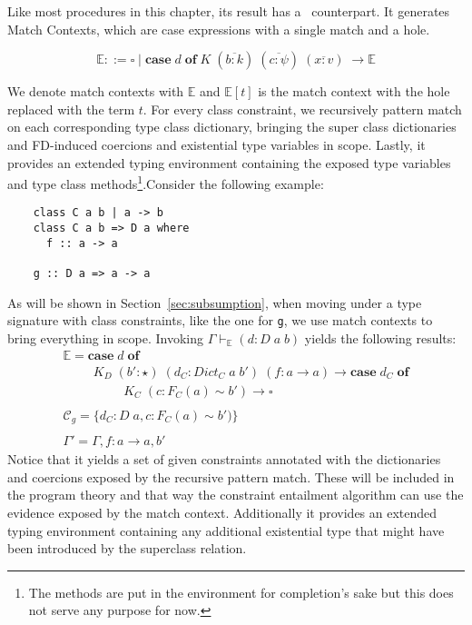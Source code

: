 Like most procedures in this chapter, its result has a \systemfc
~counterpart. It generates Match Contexts, which are case expressions with a
single match and a hole.
\begin{figure}[h]
$$
\mathbb{E} ::= \square \mid \textbf{case} \; d \; \textbf{of} \; K \;
(\overline{b : k}) \; (\overline{c : \psi}) \; (\overline{x : v}) \; \rightarrow
\mathbb{E}
$$
\end{figure}
We denote match contexts with $\mathbb{E}$ and $\mathbb{E}[t]$ is the match
context with the hole replaced with the term $t$.
For every class constraint, we recursively pattern match on each corresponding
type class dictionary, bringing the super class dictionaries and FD-induced
coercions and existential type variables in scope.
Lastly, it provides an extended typing environment containing the exposed type
variables and type class methods\footnote{The methods are put in the environment
for completion's sake but this does not serve any purpose for now.}.Consider the
following example:
\begin{verbatim}
    class C a b | a -> b
    class C a b => D a where
      f :: a -> a

    g :: D a => a -> a
\end{verbatim}
As will be shown in Section~\ref{sec:subsumption}, when moving under a type
signature with class constraints, like the one for \texttt{g}, we use match
contexts to bring everything in scope. Invoking $\Gamma \vdash_{\mathbb{E}} (d :
D \; a \; b)$ yields the following results:
\[
\begin{array}{l}
  \mathbb{E} = \textbf{case} \; d \; \textbf{of} \\ \hspace{1cm} K_D \; (b' :
  \star) \; (d_C : Dict_C \; a \; b') \; (f : a \rightarrow a) \rightarrow
  \textbf{case} \; d_C \; \textbf{of}
  \\
  \hspace{2cm} K_C \; (c : F_C(a) \sim b') \rightarrow \square
  \\
  \\
  \mathcal{C}_g = \{d_C : D \; a , c : F_C(a) \sim b')\}
  \\
  \\
  \Gamma' = \Gamma, f : a \rightarrow a, b'
\end{array}
\]
Notice that it yields a set of given constraints annotated with the dictionaries
and coercions exposed by the recursive pattern match. These will be included in
the program theory and that way the constraint entailment algorithm can use the
evidence exposed by the match context. Additionally it provides an extended
typing environment containing any additional existential type that might have
been introduced by the superclass relation.

